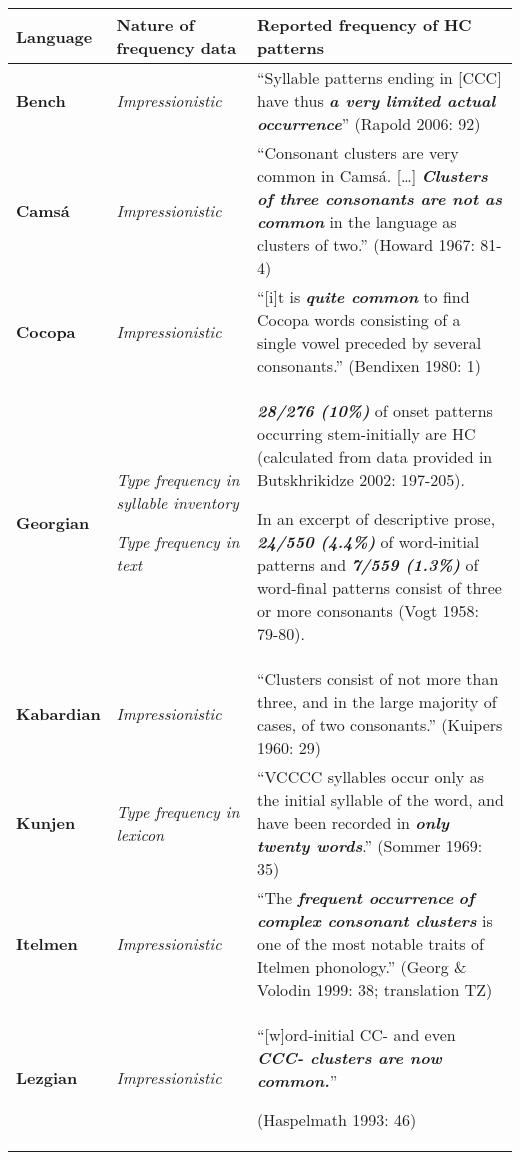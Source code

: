 \documentclass[12pt]{article}
\begin{document}
\begin{flushleft}
\tablefirsthead{}
\tablehead{}
\tabletail{}
\tablelasttail{}
\begin{supertabular}{m{0.77125984in}m{1.0900599in}m{4.32406in}}
\hline
{\bfseries Language} &
{\bfseries Nature of frequency data} &
{\bfseries Reported frequency of HC patterns}\\\hline
{\bfseries Bench} &
{\itshape Impressionistic} &
{\fontsize{10pt}{12.0pt}\selectfont\mdseries\upshape “Syllable patterns ending in [CCC] have thus \textbf{\textit{a very limited actual occurrence}}” (Rapold 2006: 92)}\\\hline
{\bfseries Camsá} &
{\itshape Impressionistic} &
{\fontsize{10pt}{12.0pt}\selectfont\mdseries\upshape “Consonant clusters are very common in Camsá.\textbf{\textit{ }}[…] \textbf{\textit{Clusters of three consonants are not as common }}in the language as clusters of two.” (Howard 1967: 81-4)}\\\hline
{\bfseries Cocopa} &
{\itshape Impressionistic} &
{\fontsize{10pt}{12.0pt}\selectfont\mdseries\upshape “[i]t is \textbf{\textit{quite common}} to find Cocopa words consisting of a single vowel preceded by several consonants.” (Bendixen 1980: 1)}\\\hline
{\bfseries Georgian} &
{\itshape Type frequency in syllable inventory}

{\itshape Type frequency in text} &
\textbf{\textit{28/276 (10\%) }}of onset patterns occurring stem-initially are HC (calculated from data provided in Butskhrikidze 2002: 197-205).

In an excerpt of descriptive prose, \textbf{\textit{24/550 (4.4\%)}} of word-initial patterns and \textbf{\textit{7/559 (1.3\%)}} of word-final patterns consist of three or more consonants (Vogt 1958: 79-80).\\\hline
{\bfseries Kabardian} &
{\itshape Impressionistic} &
“Clusters consist of not more than three, and in the large majority of cases, of two consonants.” (Kuipers 1960: 29)\\\hline
{\bfseries Kunjen} &
{\itshape Type frequency in lexicon} &
{\fontsize{10pt}{12.0pt}\selectfont\mdseries\upshape “VCCCC syllables occur only as the initial syllable of the word, and have been recorded in \textbf{\textit{only twenty words}}.” (Sommer 1969: 35)}\\\hline
{\bfseries Itelmen} &
{\itshape Impressionistic} &
{\fontsize{10pt}{12.0pt}\selectfont\mdseries\upshape “The \textbf{\textit{frequent occurrence}} \textbf{\textit{of complex consonant clusters}}\textbf{ }is one of the most notable traits of Itelmen phonology.” (Georg \& Volodin 1999: 38; translation TZ)}\\\hline
{\bfseries Lezgian} &
{\itshape Impressionistic} &
{\fontsize{10pt}{12.0pt}\selectfont\mdseries\upshape “[w]ord-initial CC- and even \textbf{\textit{CCC- clusters are now common.}}” }

(Haspelmath 1993: 46)\\\hline
\end{supertabular}
\end{flushleft}
\end{document}
